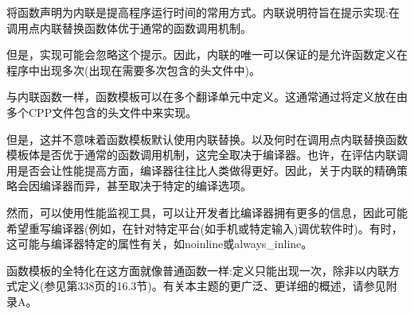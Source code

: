 将函数声明为内联是提高程序运行时间的常用方式。内联说明符旨在提示实现:在调用点内联替换函数体优于通常的函数调用机制。

但是，实现可能会忽略这个提示。因此，内联的唯一可以保证的是允许函数定义在程序中出现多次(出现在需要多次包含的头文件中)。

与内联函数一样，函数模板可以在多个翻译单元中定义。这通常通过将定义放在由多个CPP文件包含的头文件中来实现。

但是，这并不意味着函数模板默认使用内联替换。以及何时在调用点内联替换函数模板体是否优于通常的函数调用机制，这完全取决于编译器。也许，在评估内联调用是否会让性能提高方面，编译器往往比人类做得更好。因此，关于内联的精确策略会因编译器而异，甚至取决于特定的编译选项。

然而，可以使用性能监视工具，可以让开发者比编译器拥有更多的信息，因此可能希望重写编译器(例如，在针对特定平台(如手机或特定输入)调优软件时)。有时，这可能与编译器特定的属性有关，如noinline或always\_inline。

函数模板的全特化在这方面就像普通函数一样:定义只能出现一次，除非以内联方式定义(参见第338页的16.3节)。有关本主题的更广泛、更详细的概述，请参见附录A。

























